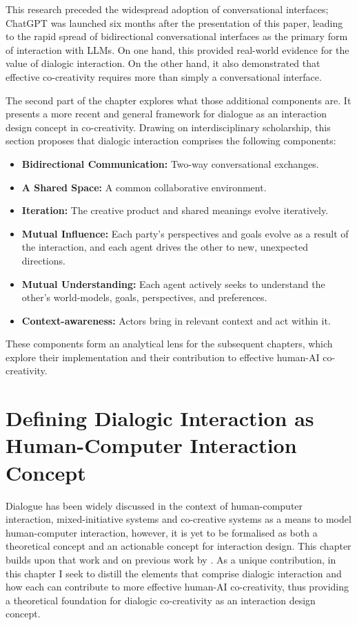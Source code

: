 This research preceded the widespread adoption of conversational interfaces; ChatGPT was launched six months after the presentation of this paper, leading to the rapid spread of bidirectional conversational interfaces as the primary form of interaction with LLMs. On one hand, this provided real-world evidence for the value of dialogic interaction. On the other hand, it also demonstrated that effective co-creativity requires more than simply a conversational interface.

The second part of the chapter explores what those additional components are. It presents a more recent and general framework for dialogue as an interaction design concept in co-creativity. Drawing on interdisciplinary scholarship, this section proposes that dialogic interaction comprises the following components:

\begin{itemize}
\item \textbf{Bidirectional Communication:} Two-way conversational exchanges.
\item \textbf{A Shared Space:} A common collaborative environment.
\item \textbf{Iteration:} The creative product and shared meanings evolve iteratively.
\item \textbf{Mutual Influence:} Each party's perspectives and goals evolve as a result of the interaction, and each agent drives the other to new, unexpected directions.
\item \textbf{Mutual Understanding:} Each agent actively seeks to understand the other's world-models, goals, perspectives, and preferences.
\item \textbf{Context-awareness:} Actors bring in relevant context and act within it.
\end{itemize}

These components form an analytical lens for the subsequent chapters, which explore their implementation and their contribution to effective human-AI co-creativity.





\section{Defining Dialogic Interaction as Human-Computer Interaction Concept}

Dialogue has been widely discussed in the context of human-computer interaction, mixed-initiative systems and co-creative systems \cite{Allen1999-sr, Yannakakis2014-zs, Deterding2017-wh} as a means to model human-computer interaction, however, it is yet to be formalised as both a theoretical concept and an actionable concept for interaction design. This chapter builds upon that work and on previous work by \cite{Bown2020-oc, Bown2024-yx}. As a unique contribution, in this chapter I seek to distill the elements that comprise dialogic interaction and how each can contribute to more effective human-AI co-creativity, thus providing a theoretical foundation for dialogic co-creativity as an interaction design concept. 

